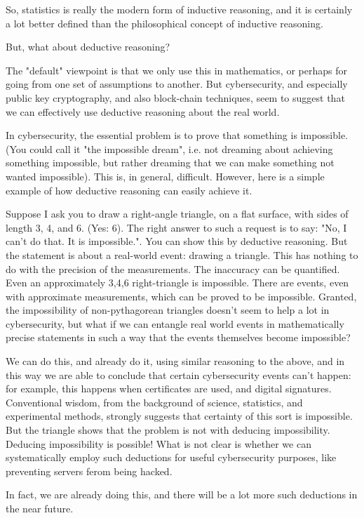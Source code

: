\documentclass[journal]{IEEEtran}
\begin{document}
So, statistics is really the modern form of inductive reasoning, and
it is certainly a lot better defined than the philosophical concept of
inductive reasoning.

But, what about deductive reasoning?

The "default" viewpoint is that we only use this in mathematics,
or perhaps for going from one set of assumptions to another. But
cybersecurity, and especially public key cryptography, and also
block-chain techniques, seem to suggest that we can effectively use
deductive reasoning about the real world.

In cybersecurity, the essential problem is to prove that something is
impossible. (You could call it "the impossible dream", i.e. not dreaming
about achieving something impossible, but rather dreaming that we can make
something not wanted impossible). This is, in general, difficult. However,
here is a simple example of how deductive reasoning can easily achieve it.

Suppose I ask you to draw a right-angle triangle, on a flat surface, with
sides of length 3, 4, and 6. (Yes: 6). The right answer to such a request
is to say: "No, I can't do that. It is impossible.". You can show this
by deductive reasoning. But the statement is about a real-world event:
drawing a triangle. This has nothing to do with the precision of the
measurements. The inaccuracy can be quantified. Even an approximately
3,4,6 right-triangle is impossible. There are events, even with
approximate measurements, which can be proved to be impossible. Granted,
the impossibility of non-pythagorean triangles doesn't seem to help a
lot in cybersecurity, but what if we can entangle real world events in
mathematically precise statements in such a way that the events themselves
become impossible?

We can do this, and already do it, using similar reasoning to the above,
and in this way we are able to conclude that certain cybersecurity events can't happen: for
example, this happens when certificates are used, and digital
signatures. Conventional wisdom, from the background of science,
statistics, and experimental methods, strongly suggests that certainty
of this sort is impossible. But the triangle shows that the problem is
not with deducing impossibility. Deducing impossibility is possible! What
is not clear is whether we can systematically employ such deductions for useful
cybersecurity purposes, like preventing servers ferom being hacked.

In fact, we are already doing this, and there will be a lot more such 
deductions in the near future.
\end{document}

